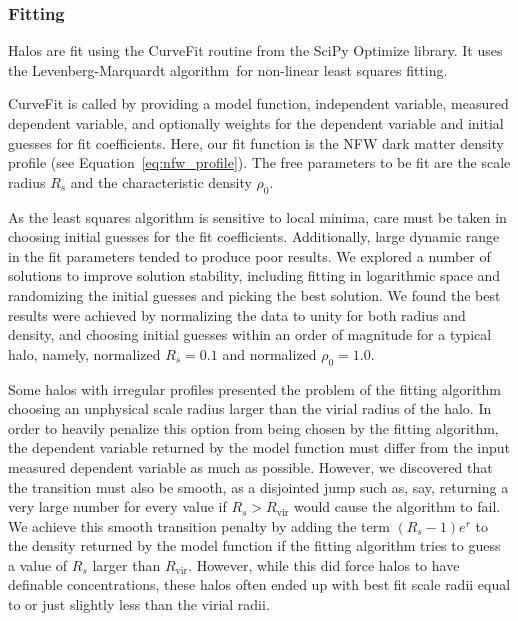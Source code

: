 \subsubsection{Fitting}
\label{subsubsec:analysis--profile_fitting--fitting}


Halos are fit using the CurveFit routine from the SciPy Optimize library.  It uses the Levenberg-Marquardt algorithm\cn\ for non-linear least squares fitting.

CurveFit is called by providing a model function, independent variable, measured dependent variable, and optionally weights for the dependent variable and initial guesses for fit coefficients.  Here, our fit function is the NFW dark matter density profile (see Equation~\ref{eq:nfw_profile}).  The free parameters to be fit are the scale radius $R_{s}$ and the characteristic density $\rho_{0}$.

As the least squares algorithm is sensitive to local minima, care must be taken in choosing initial guesses for the fit coefficients.  Additionally, large dynamic range in the fit parameters tended to produce poor results.  We explored a number of solutions to improve solution stability, including fitting in logarithmic space and randomizing the initial guesses and picking the best solution.  We found the best results were achieved by normalizing the data to unity for both radius and density, and choosing initial guesses within an order of magnitude for a typical halo, namely, normalized $R_{s} = 0.1$ and normalized $\rho_{0} = 1.0$.

Some halos with irregular profiles presented the problem of the fitting algorithm choosing an unphysical scale radius larger than the virial radius of the halo.  In order to heavily penalize this option from being chosen by the fitting algorithm, the dependent variable returned by the model function must differ from the input measured dependent variable as much as possible.  However, we discovered that the transition must also be smooth, as a disjointed jump such as, say, returning a very large number for every value if $R_{s} > R_{\mathrm{vir}}$ would cause the algorithm to fail.  We achieve this smooth transition penalty by adding the term $(R_{s} - 1) e^{r}$ to the density returned by the model function if the fitting algorithm tries to guess a value of $R_{s}$ larger than $R_{\mathrm{vir}}$.  However, while this did force halos to have definable concentrations, these halos often ended up with best fit scale radii equal to or just slightly less than the virial radii.


